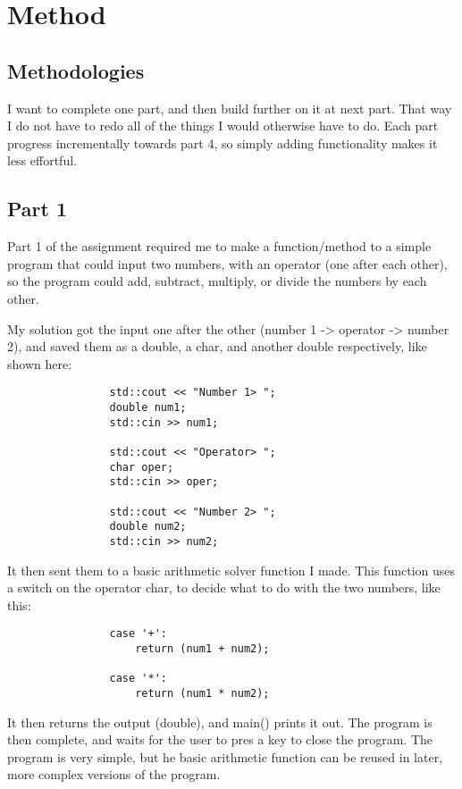 \documentclass{article}
\begin{document}
	
	
	
	
	\section{Method}
		\subsection{Methodologies}
			I want to complete one part, and then build further on it at next part. That way I do not have to redo all of the things I would otherwise have to do. Each part progress incrementally towards part 4, so simply adding functionality makes it less effortful.
		
		
		\subsection{Part 1}
			Part 1 of the assignment required me to make a function/method to a simple program that could input two numbers, with an operator (one after each other), so the program could add, subtract, multiply, or divide the numbers by each other.
			
			My solution got the input one after the other (number 1 -> operator -> number 2), and saved them as a double, a char, and another double respectively, like shown here:
			\begin{lstlisting}
				std::cout << "Number 1> ";
				double num1;
				std::cin >> num1;
				
				std::cout << "Operator> ";
				char oper;
				std::cin >> oper;
				
				std::cout << "Number 2> ";
				double num2;
				std::cin >> num2;
			\end{lstlisting}
			
			It then sent them to a basic arithmetic solver function I made. This function uses a switch on the operator char, to decide what to do with the two numbers, like this:
			\begin{lstlisting}
				case '+':
					return (num1 + num2);
					
				case '*':
					return (num1 * num2);
			\end{lstlisting}
			
			It then returns the output (double), and main() prints it out. The program is then complete, and waits for the user to pres a key to close the program. The program is very simple, but he basic arithmetic function can be reused in later, more complex versions of the program.
		
\end{document}
